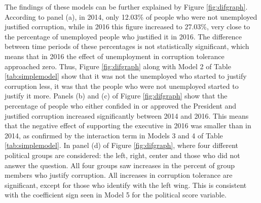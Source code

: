 \documentclass[12pt,a4]{article}
\begin{document}
The findings of these models can be further explained by Figure \ref{fig:difgraph}. According to panel (a), in 2014, only 12.03\% of people who were not unemployed justified corruption, while in 2016 this figure increased to 27.03\%, very close to the percentage of unemployed people who justified it in 2016. The difference between time periods of these percentages is not statistically significant, which means that in 2016 the effect of unemployment in corruption tolerance approached zero. Thus, Figure \ref{fig:difgraph} along with Model 2 of Table \ref{tab:simplemodel} show that it was not the unemployed who started to justify corruption less, it was that the people who were not unemployed started to justify it more. Panels (b) and (c) of Figure \ref{fig:difgraph} show that the percentage of people who either confided in or approved the President and justified corruption increased significantly  between 2014 and 2016. This means that the negative effect of supporting the executive in 2016 was smaller than in 2014, as confirmed by the interaction term in Models 3 and 4 of Table \ref{tab:simplemodel}. In panel (d) of Figure \ref{fig:difgraph}, where four different political groups are considered: the left, right, center and those who did not answer the question. All four groups saw increases in the percent of group members who justify corruption. All increases in corruption tolerance are significant, except for those who identify with the left wing. This is consistent with the coefficient sign seen in Model 5 for the political score variable. 
\end{document}
